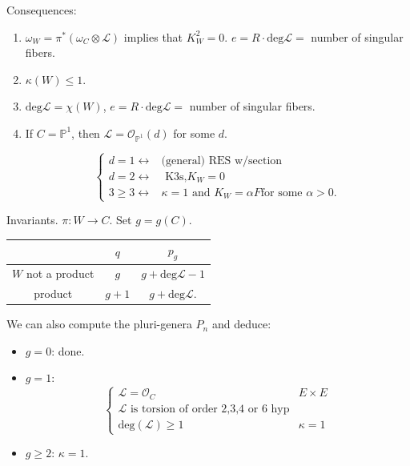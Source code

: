\medskip\noindent
Consequences:
\begin{enumerate}
\item $\omega_W=\pi^*(\omega_C \otimes
\mathcal{L})$
implies that $K_W^2=0$.
$e=R\cdot \text{deg} \mathcal{L}=$
number of singular fibers.

\item $\kappa(W) \leq  1$.

\item $\text{deg} \mathcal{L}=\chi(W)$,
$e=R\cdot \text{deg} \mathcal{L}=$
number of singular fibers.

\item If $C=\mathbb{P}^1$,
then
$\mathcal{L}=\mathcal{O}_{\mathbb{P}^1}(d)$
for some $d$.

$$
\begin{cases}
d=1\leftrightarrow&\text{(general)
RES w/section} \\
d=2\leftrightarrow&\text{ K3s,
}K_W=0\\
3\geq 3\leftrightarrow&
\kappa=1\text{ and }K_W=\alpha F
\text{for some }\alpha>0.
\end{cases}
$$
\end{enumerate}

\medskip\noindent
Invariants. $\pi:W \to C$.
Set $g=g(C)$.

\begin{center}\begin{tabular}{c|c c}
& $q$ & $p_g$\\
\hline
$W$ not a product &  $g$ & $ g+
\text{deg}\mathcal{L}-1$ \\
product& $g+1$ &  $g+\text{deg}\mathcal{L}$.
\end{tabular}\end{center}

\noindent
We can also compute the pluri-genera $P_n$
and deduce:
\begin{itemize}
\item $g=0$: done.

\item $g=1$:
 $$
\begin{cases}
\mathcal{L}=\mathcal{O}_C\qquad &E\times E \\
\mathcal{L}\text{ is torsion of order 2,3,4
or 6 hyp}\\
\text{deg}(\mathcal{L})\geq 1\qquad &\kappa=1
\end{cases}
$$

\item $g\geq 2$: $\kappa=1$.
\end{itemize}

